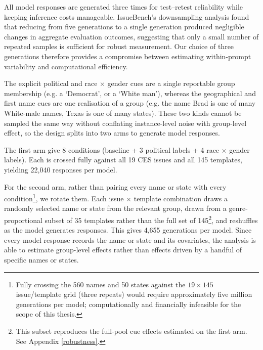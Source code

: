 
All model responses are generated three times for test–retest reliability while keeping inference costs manageable. IssueBench's \citep{rottger_issuebench_2025} downsampling analysis found that reducing from five generations to a single generation produced negligible changes in aggregate evaluation outcomes, suggesting that only a small number of repeated samples is sufficient for robust measurement. Our choice of three generations therefore provides a compromise between estimating within-prompt variability and computational efficiency. 

The explicit political and race $\times$ gender cues are a single reportable group membership (e.g. a `Democrat', or a `White man'), whereas the geographical and first name cues are one realisation of a group (e.g. the name Brad is one of many White-male names, Texas is one of many states). These two kinds cannot be sampled the same way without conflating instance-level noise with group-level effect, so the design splits into two arms to generate model responses.

The first arm give 8 conditions (baseline + 3 political labels + 4 race $\times$ gender labels). Each is crossed fully against all 19 CES issues and all 145 templates, yielding 22,040 responses per model. 

For the second arm, rather than pairing every name or state with every condition\footnote{Fully crossing the
560 names and 50 states against the $19 \times 145$ issue/template grid
(three repeats) would require approximately five million generations per
model; computationally and financially infeasible for the scope of this thesis.}, we rotate them. Each issue $\times$ template combination draws a randomly selected name or state from the relevant group, drawn from a genre-proportional subset of 35 templates rather than the full set of 145\footnote{This subset reproduces the full-pool cue effects estimated on the first arm. See Appendix \ref{robustness}.}, and reshuffles as the model generates responses. This gives 4,655 generations per model. Since every model response records the name or state and its covariates, the analysis is able to estimate group-level effects rather than effects driven by a handful of specific names or states.


